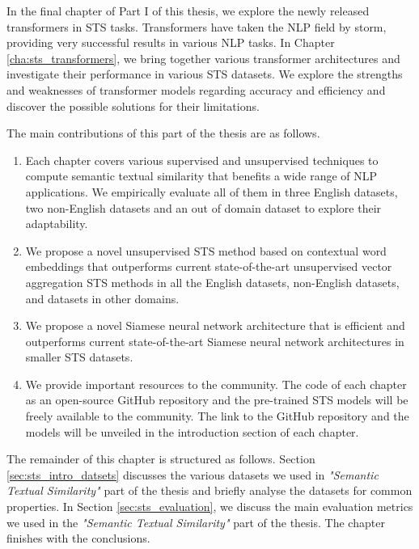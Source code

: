 In the final chapter of Part I of this thesis, we explore the newly released transformers in STS tasks. Transformers have taken the NLP field by storm, providing very successful results in various NLP tasks. In Chapter \ref{cha:sts_transformers}, we bring together various transformer architectures \autocite{devlin-etal-2019-bert,yang2019xlnet,liu2019roberta} and investigate their performance in various STS datasets. We explore the strengths and weaknesses of transformer models regarding accuracy and efficiency and discover the possible solutions for their limitations.


The main contributions of this part of the thesis are as follows.

\begin{enumerate}
	\item Each chapter covers various supervised and unsupervised techniques to compute semantic textual similarity that benefits a wide range of NLP applications. We empirically evaluate all of them in three English datasets, two non-English datasets and an out of domain dataset to explore their adaptability.  
	
	\item We propose a novel unsupervised STS method based on contextual word embeddings that outperforms current state-of-the-art unsupervised vector aggregation STS methods in all the English datasets, non-English datasets, and datasets in other domains.
	
	\item We propose a novel Siamese neural network architecture that is efficient and outperforms current state-of-the-art Siamese neural network architectures in smaller STS datasets. 
	
	\item We provide important resources to the community. The code of each chapter as an open-source GitHub repository and the pre-trained STS models will be freely available to the community. The link to the GitHub repository and the models will be unveiled in the introduction section of each chapter. 
\end{enumerate}

The remainder of this chapter is structured as follows. Section \ref{sec:sts_intro_datsets} discusses the various datasets we used in \textit{"Semantic Textual Similarity"} part of the thesis and briefly analyse the datasets for common properties. In Section \ref{sec:sts_evaluation}, we discuss the main evaluation metrics we used in the \textit{"Semantic Textual Similarity"} part of the thesis. The chapter finishes with the conclusions.


